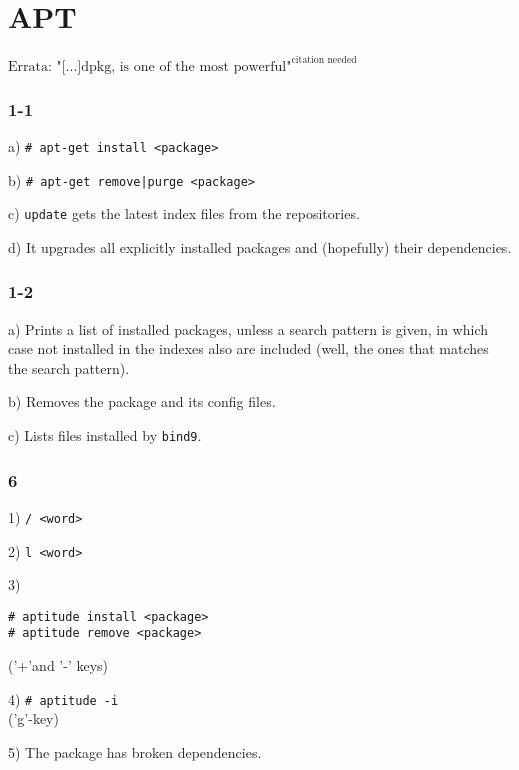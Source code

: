 
\chapter{APT}
$\text{Errata: "[...]dpkg, is one of the most powerful"}^{\text{citation needed}}$
\subsection{1-1}
a) \verb=# apt-get install <package>=

b) \verb=# apt-get remove|purge <package>=

c) \verb=update= gets the latest index files from the repositories.

d) It upgrades all explicitly installed packages and (hopefully) their dependencies.

\subsection{1-2}
a) Prints a list of installed packages, unless a search pattern is given, in which case not installed in the indexes also are included (well, the ones that matches the search pattern).

b) Removes the package and its config files.

c) Lists files installed by \verb=bind9=.


%



\subsection{6}
1) \verb=/ <word>=

2) \verb=l <word>=

3) \begin{verbatim}# aptitude install <package>
# aptitude remove <package>\end{verbatim}
('+'and '-' keys)

4) \verb=# aptitude -i=\\
('g'-key)

5) The package has broken dependencies.


